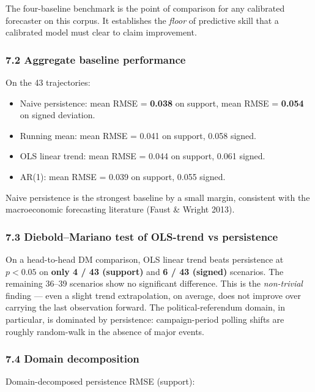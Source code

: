 \documentclass[
]{article}
\providecommand{\tightlist}{%
  \setlength{\itemsep}{0pt}\setlength{\parskip}{0pt}}
\begin{document}
The four-baseline benchmark is the point of comparison for any
calibrated forecaster on this corpus. It establishes the \emph{floor} of
predictive skill that a calibrated model must clear to claim
improvement.

\subsubsection{7.2 Aggregate baseline
performance}\label{aggregate-baseline-performance}

On the 43 trajectories:

\begin{itemize}
\tightlist
\item
  Naive persistence: mean RMSE = \textbf{0.038} on support, mean RMSE =
  \textbf{0.054} on signed deviation.
\item
  Running mean: mean RMSE = 0.041 on support, 0.058 signed.
\item
  OLS linear trend: mean RMSE = 0.044 on support, 0.061 signed.
\item
  AR(1): mean RMSE = 0.039 on support, 0.055 signed.
\end{itemize}

Naive persistence is the strongest baseline by a small margin,
consistent with the macroeconomic forecasting literature (Faust \&
Wright 2013).

\subsubsection{7.3 Diebold--Mariano test of OLS-trend vs
persistence}\label{dieboldmariano-test-of-ols-trend-vs-persistence}

On a head-to-head DM comparison, OLS linear trend beats persistence at
\(p < 0.05\) on \textbf{only 4 / 43 (support)} and \textbf{6 / 43
(signed)} scenarios. The remaining 36--39 scenarios show no significant
difference. This is the \emph{non-trivial} finding --- even a slight
trend extrapolation, on average, does not improve over carrying the last
observation forward. The political-referendum domain, in particular, is
dominated by persistence: campaign-period polling shifts are roughly
random-walk in the absence of major events.

\subsubsection{7.4 Domain decomposition}\label{domain-decomposition}

Domain-decomposed persistence RMSE (support):
\end{document}
